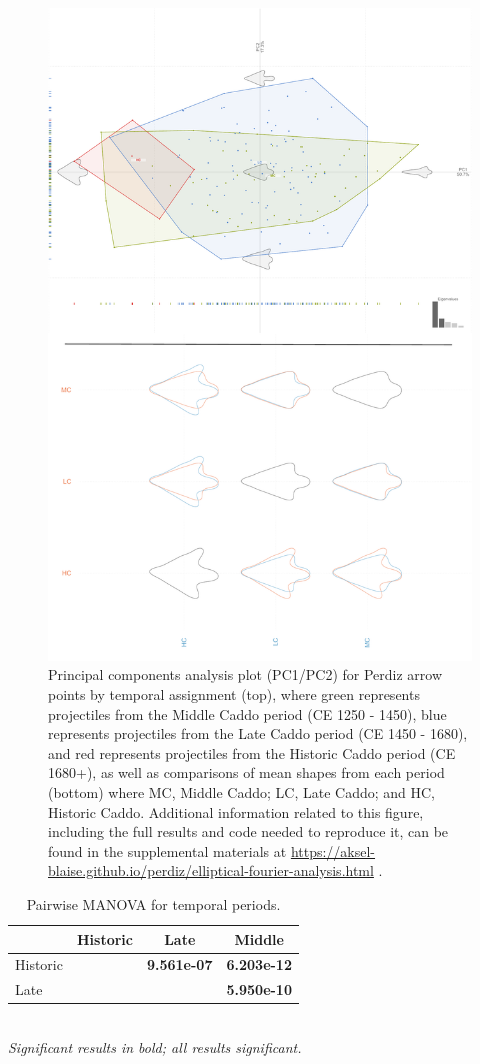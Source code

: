 \documentclass[review]{elsarticle}
\begin{document}
\begin{figure}[!]\centering
\includegraphics[width=0.82\linewidth]{temporal.pdf}
\caption{Principal components analysis plot (PC1/PC2) for Perdiz arrow points by temporal assignment (top), where green represents projectiles from the Middle Caddo period (CE 1250 - 1450), blue represents projectiles from the Late Caddo period (CE 1450 - 1680), and red represents projectiles from the Historic Caddo period (CE 1680+), as well as comparisons of mean shapes from each period (bottom) where MC, Middle Caddo; LC, Late Caddo; and HC, Historic Caddo. Additional information related to this figure, including the full results and code needed to reproduce it, can be found in the supplemental materials at \href{https://aksel-blaise.github.io/perdiz/elliptical-fourier-analysis.html}{https://aksel-blaise.github.io/perdiz/elliptical-fourier-analysis.html} \citep{RN8980}.}
\label{fig:gmtemp}
\end{figure}

\begin{table}[tbh]\centering
\footnotesize
\caption{Pairwise MANOVA for temporal periods.}
\centering
\begin{tabular}{lccc}
\hline
 & Historic & Late & Middle\\
\hline
Historic & & \textbf{9.561e-07} & \textbf{6.203e-12}\\
Late & & & \textbf{5.950e-10}\\
\hline
\end{tabular}\\
\textit{Significant results in bold; all results significant.}
\label{tab:tab.shape.time}
\end{table}
\end{document}
